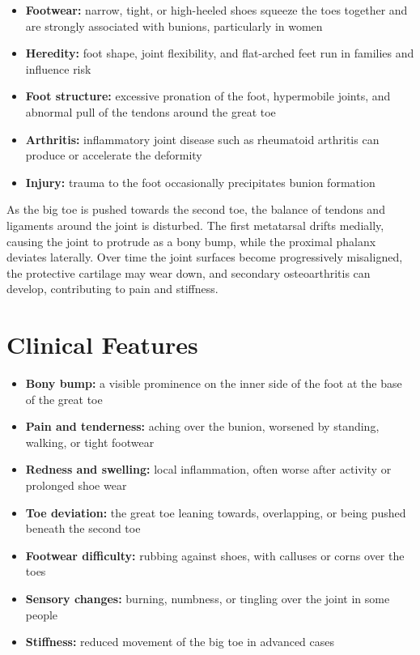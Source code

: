 \begin{itemize}
    \item \textbf{Footwear:} narrow, tight, or high-heeled shoes squeeze the toes together and are strongly associated with bunions, particularly in women
    \item \textbf{Heredity:} foot shape, joint flexibility, and flat-arched feet run in families and influence risk
    \item \textbf{Foot structure:} excessive pronation of the foot, hypermobile joints, and abnormal pull of the tendons around the great toe
    \item \textbf{Arthritis:} inflammatory joint disease such as rheumatoid arthritis can produce or accelerate the deformity
    \item \textbf{Injury:} trauma to the foot occasionally precipitates bunion formation
\end{itemize}

As the big toe is pushed towards the second toe, the balance of tendons and ligaments around the joint is disturbed. The first metatarsal drifts medially, causing the joint to protrude as a bony bump, while the proximal phalanx deviates laterally. Over time the joint surfaces become progressively misaligned, the protective cartilage may wear down, and secondary osteoarthritis can develop, contributing to pain and stiffness.

\section*{Clinical Features}
\begin{itemize}
    \item \textbf{Bony bump:} a visible prominence on the inner side of the foot at the base of the great toe
    \item \textbf{Pain and tenderness:} aching over the bunion, worsened by standing, walking, or tight footwear
    \item \textbf{Redness and swelling:} local inflammation, often worse after activity or prolonged shoe wear
    \item \textbf{Toe deviation:} the great toe leaning towards, overlapping, or being pushed beneath the second toe
    \item \textbf{Footwear difficulty:} rubbing against shoes, with calluses or corns over the toes
    \item \textbf{Sensory changes:} burning, numbness, or tingling over the joint in some people
    \item \textbf{Stiffness:} reduced movement of the big toe in advanced cases
\end{itemize}

